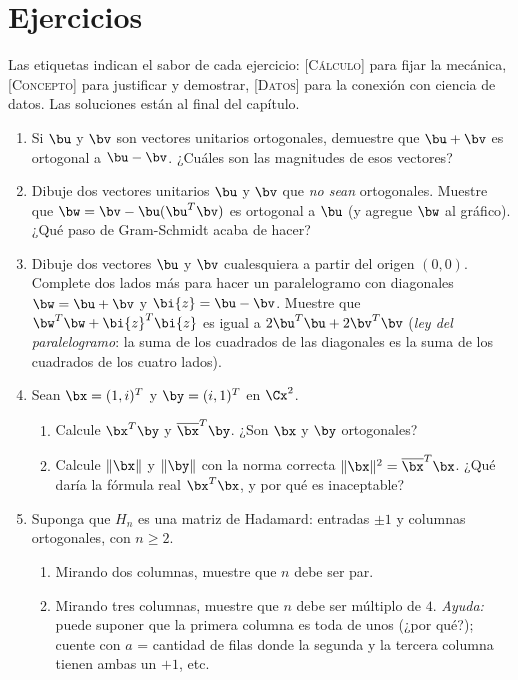 \section*{Ejercicios}

\noindent\footnotesize Las etiquetas indican el sabor de cada ejercicio:
\textsc{[Cálculo]} para fijar la mecánica, \textsc{[Concepto]} para
justificar y demostrar, \textsc{[Datos]} para la conexión con ciencia de
datos. Las soluciones están al final del capítulo.\normalsize

\begin{enumerate}[leftmargin=*,label=\textbf{\thechapter.\arabic*}]

\item {} Si $\bu$ y $\bv$ son vectores unitarios ortogonales,
demuestre que $\bu+\bv$ es ortogonal a $\bu-\bv$. ¿Cuáles son las magnitudes
de esos vectores?

\item {} Dibuje dos vectores unitarios $\bu$ y $\bv$ que
\emph{no sean} ortogonales. Muestre que $\bw=\bv-\bu(\bu^T\bv)$ es
ortogonal a $\bu$ (y agregue $\bw$ al gráfico). ¿Qué paso de Gram-Schmidt
acaba de hacer?

\item {} Dibuje dos vectores $\bu$ y $\bv$ cualesquiera a
partir del origen $(0,0)$. Complete dos lados más para hacer un
paralelogramo con diagonales $\bw=\bu+\bv$ y $\bi{z}=\bu-\bv$. Muestre que
$\bw^T\bw+\bi{z}^T\bi{z}$ es igual a $2\bu^T\bu+2\bv^T\bv$
(\emph{ley del paralelogramo}: la suma de los cuadrados de las diagonales es
la suma de los cuadrados de los cuatro lados).

\item {} Sean $\bx=(1,i)^T$ y $\by=(i,1)^T$ en
$\Cx^2$.
\begin{enumerate}[label=(\alph*)]
\item Calcule $\bx^T\by$ y $\overline{\bx}^T\by$. ¿Son $\bx$ y
$\by$ ortogonales?
\item Calcule $\|\bx\|$ y $\|\by\|$ con la norma correcta
$\|\bx\|^2=\overline{\bx}^T\bx$. ¿Qué daría la fórmula real
$\bx^T\bx$, y por qué es inaceptable?
\end{enumerate}

\item {} Suponga que $H_n$ es una matriz de Hadamard: entradas
$\pm1$ y columnas ortogonales, con $n\ge2$.
\begin{enumerate}[label=(\alph*)]
\item Mirando dos columnas, muestre que $n$ debe ser par.
\item Mirando tres columnas, muestre que $n$ debe ser múltiplo de $4$.
\emph{Ayuda:} puede suponer que la primera columna es toda de unos
(¿por qué?); cuente con $a$ = cantidad de filas donde la segunda y la
tercera columna tienen ambas un $+1$, etc.
\end{enumerate}


\end{enumerate}
